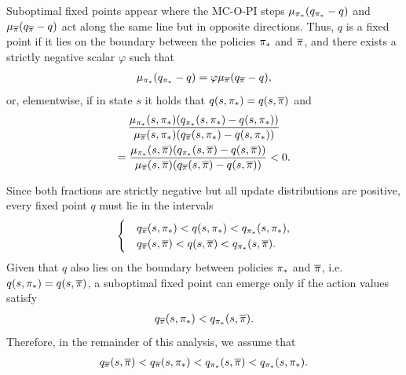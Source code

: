 Suboptimal fixed points appear where the MC-O-PI steps $\mu_{{\pi}_*} (q_{{\pi}_*} - q)$ and $\mu_{\overline{\pi}} (q_{\overline{\pi}} - q)$ act along the same line but in opposite directions.
Thus, $q$ is a fixed point if it lies on the boundary between the policies ${\pi}_*$ and $\overline{\pi}$, and there exists a strictly negative scalar $\varphi$ such that
\begin{align}
    \mu_{{\pi}_*} (q_{{\pi}_*} - q) = \varphi \mu_{\overline{\pi}} (q_{\overline{\pi}} - q) ,
\end{align}
or, elementwise, if in state $s$ it holds that $q(s, {\pi}_*) = q(s, \overline{\pi})$ and
\begin{multline}
\label{eq: flows phi}
    \dfrac{\mu_{{\pi}_*}(s, {\pi}_*)(q_{{\pi}_*}(s, {\pi}_*) - q(s, {\pi}_*))}
    {\mu_{\overline{\pi}}(s, {\pi}_*)(q_{\overline{\pi}}(s, {\pi}_*) - q(s, {\pi}_*))}
    \\
    =
    \dfrac{\mu_{{\pi}_*}(s, \overline{\pi})(q_{{\pi}_*}(s, \overline{\pi}) - q(s, \overline{\pi}))}
    {\mu_{\overline{\pi}}(s, \overline{\pi})(q_{\overline{\pi}}(s, \overline{\pi}) - q(s, \overline{\pi}))}
    < 0 .
\end{multline}

Since both fractions are strictly negative but all update distributions are positive, every fixed point $q$ must lie in the intervals
\begin{align}
    \label{eq: box of q}
    \begin{cases}
        &q_{\overline{\pi}}(s, {\pi}_*) < q(s, {\pi}_*) < q_{{\pi}_*}(s, {\pi}_*) ,
        \\
        &q_{\overline{\pi}}(s, \overline{\pi}) < q(s, \overline{\pi}) < q_{{\pi}_*}(s, \overline{\pi}) .
    \end{cases}
\end{align}
Given that $q$ also lies on the boundary between policies ${\pi}_*$ and $\overline{\pi}$, i.e. $q(s, {\pi}_*) = q(s, \overline{\pi})$,
a suboptimal fixed point can emerge only if the action values satisfy
\begin{align}
\label{eq: condition non greedy fp}
    q_{\overline{\pi}}(s, {\pi}_*) 
    < q_{{\pi}_*}(s, \overline{\pi}) .
\end{align}
Therefore, in the remainder of this analysis, we assume that
\begin{align}
\label{eq: condition on aval for non greedy fp}
    q_{\overline{\pi}}(s, \overline{\pi})
    < q_{\overline{\pi}}(s, {\pi}_*) 
    < q_{{\pi}_*}(s, \overline{\pi})
    < q_{{\pi}_*}(s, {\pi}_*) .
\end{align}



